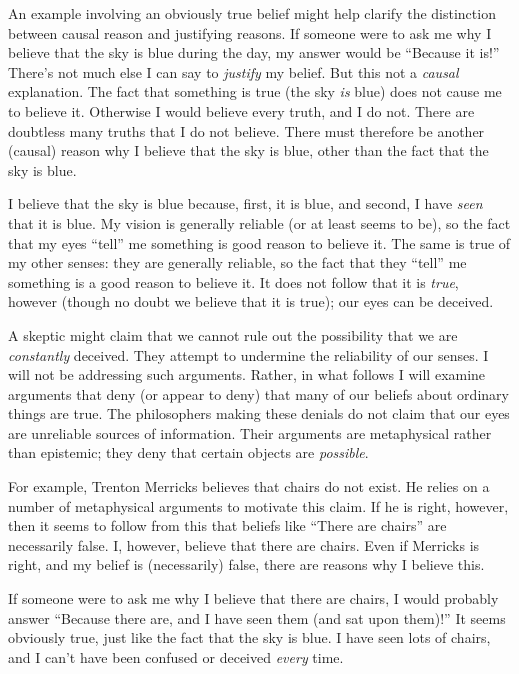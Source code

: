 \documentclass[12pt,twoside]{reedfancy}
\begin{document}
\begin{spacing}{1.25}
An example involving an obviously true belief might help clarify the
distinction between causal reason and justifying reasons.  If someone
were to ask me why I believe that the sky is blue during the day, my
answer would be ``Because it is!''  There's not much else I can say to
{\em justify} my belief.  But this not a {\em causal} explanation.
The fact that something is true (the sky {\em is} blue) does not cause
me to believe it.  Otherwise I would believe every truth, and I do
not.  There are doubtless many truths that I do not believe.  There
must therefore be another (causal) reason why I believe that the sky
is blue, other than the fact that the sky is blue.

I believe that the sky is blue because, first, it is blue, and second,
I have {\em seen} that it is blue.  My vision is generally reliable
(or at least seems to be), so the fact that my eyes ``tell'' me
something is good reason to believe it.  The same is true of my other
senses: they are generally reliable, so the fact that they ``tell'' me
something is a good reason to believe it.  It does not follow that it
is {\em true}, however (though no doubt we believe that it is true);
our eyes can be deceived.

A skeptic might claim that we cannot rule out the possibility that we
are {\em constantly} deceived.  They attempt to undermine the
reliability of our senses.  I will not be addressing such arguments.
Rather, in what follows I will examine arguments that deny (or appear
to deny) that many of our beliefs about ordinary things are true.  The
philosophers making these denials do not claim that our eyes are
unreliable sources of information.  Their arguments are metaphysical
rather than epistemic; they deny that certain objects are {\em
  possible}.

For example, Trenton Merricks believes that chairs do not exist.  He
relies on a number of metaphysical arguments to motivate this claim.
If he is right, however, then it seems to follow from this that
beliefs like ``There are chairs'' are necessarily false.  I, however,
believe that there are chairs.  Even if Merricks is right, and my
belief is (necessarily) false, there are reasons why I believe this.

If someone were to ask me why I believe that there are chairs, I would
probably answer ``Because there are, and I have seen them (and sat
upon them)!''  It seems obviously true, just like the fact that the
sky is blue.  I have seen lots of chairs, and I can't have been
confused or deceived {\em every} time.


\end{spacing}
\end{document}
